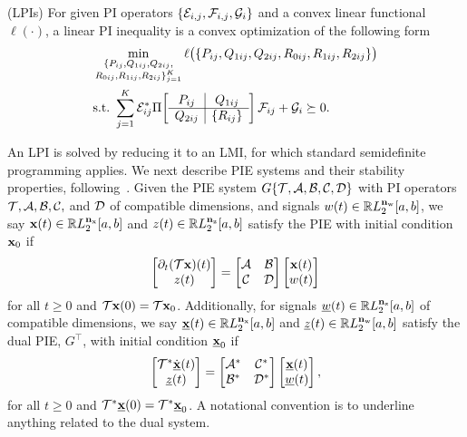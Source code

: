 \begin{definition}(LPIs)
\label{def:lpi-operator}
For given PI operators $\{\mathcal{E}_{i,j}, \mathcal{F}_{i,j}, \mathcal{G}_i\}$ and a convex
linear functional $\ell(\cdot)$, a linear PI inequality is a convex
optimization of the following form
\begin{align*}
& \min\limits_{\substack{\{P_{ij},Q_{1ij},Q_{2ij},\\R_{0ij},R_{1ij},R_{2ij}\}_{j=1}^K}}
\ell\bigl(\{P_{ij},Q_{1ij},Q_{2ij},R_{0ij},R_{1ij},R_{2ij}\}\bigr) \\
& {\mathrm{s. t. }}\ \sum\limits_{j=1}^K \mathcal{E}_{ij}^*
\Pi\!\left[ \begin{array}{c|c} P_{ij} & Q_{1ij}\\ \hline Q_{2ij} & \{R_{ij}\} \end{array} \right]\mathcal{F}_{ij}
+\mathcal{G}_i\succeq0.
\end{align*}
\end{definition}
An LPI is solved by reducing it to an LMI, for which standard semidefinite programming applies.
We next describe PIE systems and their stability properties,
following~\cite{shivaknew}.
Given the PIE system $G\{\mathcal{T}, \mathcal{A}, \mathcal{B}, \mathcal{C}, \mathcal{D}\}$
with PI operators $\mathcal{T}, \mathcal{A}, \mathcal{B}, \mathcal{C},$ and $\mathcal{D}$ of
compatible dimensions,
and signals $w(t)\in \mathbb{R} L_2^{\mathbf{n}_{{\mathrm{w}}}}[a,b]$, we say
$\mathbf{x}(t)\in\mathbb{R} L_2^{\mathbf{n}_{{\mathrm{x}}}}[a,b]$ and $z(t)\in \mathbb{R} L_2^{\mathbf{n}_{{\mathrm{z}}}}[a,b]$
satisfy the PIE with initial condition $\mathbf{x}_0$ if
\begin{equation*}
\begin{bmatrix}\partial_t(\mathcal{T}\mathbf{x})(t)\\ z(t)\end{bmatrix} = \begin{bmatrix}\mathcal{A} & \mathcal{B} \\
\mathcal{C} & \mathcal{D}\end{bmatrix}\begin{bmatrix}\mathbf{x}(t) \\ w(t)\end{bmatrix}
\end{equation*}
for all $t\geq0$ and $\mathcal{T}\mathbf{x}(0) = \mathcal{T}\mathbf{x}_0$. Additionally, for
signals $\underline{w}(t)\in\mathbb{R} L_2^{\mathbf{n}_{{\mathrm{z}}}}[a,b]$
of compatible dimensions, we say $\underline{\mathbf{x}}(t)\in\mathbb{R} L_2^{\mathbf{n}_{{\mathrm{x}}}}[a,b]$
and $\underline{z}(t)\in\mathbb{R} L_2^{\mathbf{n}_{{\mathrm{w}}}}[a,b]$
satisfy the dual PIE, $G^\top$, with initial condition $\underline{\mathbf{x}}_0$ if
\begin{equation*}
\begin{bmatrix}\mathcal{T}^*\underline{\dot{\mathbf{x}}}(t)\\ \underline{z}(t)\end{bmatrix}
=
\begin{bmatrix}\mathcal{A}^* & \mathcal{C}^*\\
\mathcal{B}^* & \mathcal{D}^*\end{bmatrix}
\begin{bmatrix}\underline{\mathbf{x}}(t)\\ \underline{w}(t)\end{bmatrix},
\end{equation*}
for all $t\geq0$ and $\mathcal{T}^*\underline{\mathbf{x}}(0) =
\mathcal{T}^*\underline{\mathbf{x}}_0$. A notational convention
is to underline anything related to the dual system.
